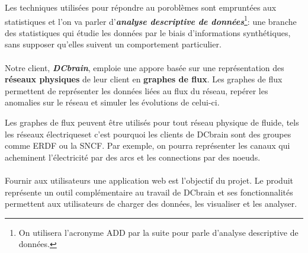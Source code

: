 	Les techniques utilisées pour répondre au poroblèmes sont empruntées aux statistiques et l'on va parler d'\textit{\textbf{analyse descriptive de données}}\footnote{On utilisera l'acronyme ADD par la suite pour parle d'analyse descriptive de données.}: une branche des statistiques qui étudie les données par le biais d'informations synthétiques, sans supposer qu'elles suivent un comportement particulier.
	\paragraph{}Notre client, \textit{\textbf{DCbrain}}, emploie une appore basée sur une représentation des \textbf{réseaux physiques} de leur client en \textbf{graphes de flux}. Les graphes de flux permettent de représenter les données liées au flux du réseau, repérer les anomalies sur le réseau et simuler les évolutions de celui-ci.
	
	Les graphes de flux peuvent être utilisés pour tout réseau physique de fluide, tels les réseaux électriqueset c’est pourquoi les clients de DCbrain sont des groupes comme ERDF ou la SNCF. Par exemple, on pourra représenter les canaux qui acheminent l'électricité par des arcs et les connections par des noeuds.
	\paragraph{}Fournir aux utilisateurs une application web est l'objectif du projet. Le produit représente un outil complémentaire au travail de DCbrain et ses fonctionnalités permettent aux utilisateurs de charger des données, les visualiser et les analyser. 
	
